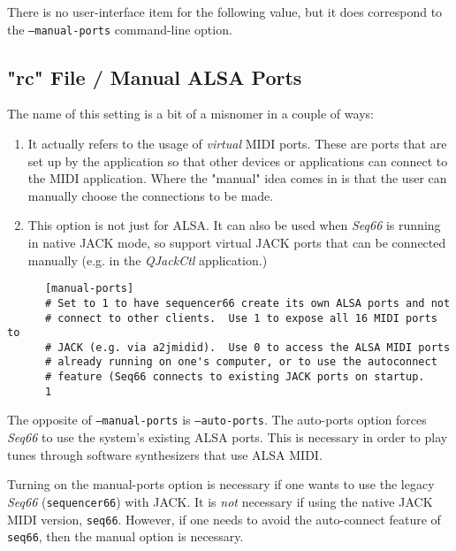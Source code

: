    There is no user-interface item for the following value, but
   it does correspond to the \texttt{--manual-ports} command-line
   option.

\subsection{"rc" File / Manual ALSA Ports}
\label{subsec:seq66_rc_file_manual_ports}

   The name of this setting is a bit of a misnomer in a couple of ways:

   \begin{enumerate}
      \item It actually refers to the usage of \textsl{virtual} MIDI ports.
         These are ports that are set up by the application so that other
         devices or applications can connect to the MIDI application.
         Where the "manual" idea comes in is that the user can manually choose
         the connections to be made.
      \item This option is not just for ALSA.  It can also be used when
         \textsl{Seq66} is running in native JACK mode, so support
         virtual JACK ports that can be connected manually (e.g. in the
         \textsl{QJackCtl} application.)
   \end{enumerate}

   \begin{verbatim}
      [manual-ports]
      # Set to 1 to have sequencer66 create its own ALSA ports and not
      # connect to other clients.  Use 1 to expose all 16 MIDI ports to
      # JACK (e.g. via a2jmidid).  Use 0 to access the ALSA MIDI ports
      # already running on one's computer, or to use the autoconnect
      # feature (Seq66 connects to existing JACK ports on startup.
      1
   \end{verbatim}

   The opposite of \texttt{--manual-ports}
   is \texttt{--auto-ports}.  The auto-ports option
   forces \textsl{Seq66} to use the system's existing ALSA ports.
   This is necessary in order to play tunes through software synthesizers that
   use ALSA MIDI.

   Turning on the manual-ports option is necessary if one
   wants to use the legacy \textsl{Seq66} (\texttt{sequencer66})
   with JACK.
   It is \textsl{not} necessary if using the native JACK MIDI version,
   \texttt{seq66}.
   However, if one needs to avoid the auto-connect feature of \texttt{seq66},
   then the manual option is necessary.


